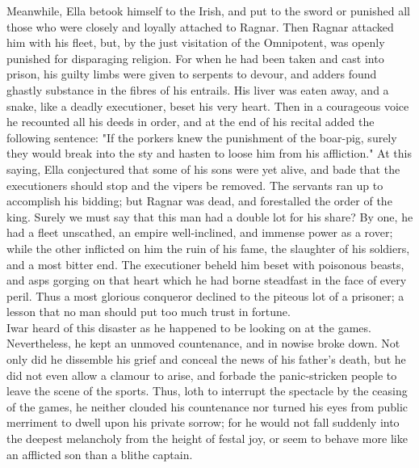 \documentclass[10pt,a4paper]{report}
\begin{document}
Meanwhile, Ella betook himself to the Irish, and put to the sword or punished all those who were closely and loyally attached to Ragnar. Then Ragnar attacked him with his fleet, but, by the just visitation of the Omnipotent, was openly punished for disparaging religion. For when he had been taken and cast into prison, his guilty limbs were given to serpents to devour, and adders found ghastly substance in the fibres of his entrails. His liver was eaten away, and a snake, like a deadly executioner, beset his very heart. Then in a courageous voice he recounted all his deeds in order, and at the end of his recital added the following sentence: "If the porkers knew the punishment of the boar-pig, surely they would break into the sty and hasten to loose him from his affliction." At this saying, Ella conjectured that some of his sons were yet alive, and bade that the executioners should stop and the vipers be removed. The servants ran up to accomplish his bidding; but Ragnar was dead, and forestalled the order of the king. Surely we must say that this man had a double lot for his share? By one, he had a fleet unscathed, an empire well-inclined, and immense power as a rover; while the other inflicted on him the ruin of his fame, the slaughter of his soldiers, and a most bitter end. The executioner beheld him beset with poisonous beasts, and asps gorging on that heart which he had borne steadfast in the face of every peril. Thus a most glorious conqueror declined to the piteous lot of a prisoner; a lesson that no man should put too much trust in fortune.\\

Iwar heard of this disaster as he happened to be looking on at the games. Nevertheless, he kept an unmoved countenance, and in nowise broke down. Not only did he dissemble his grief and conceal the news of his father's death, but he did not even allow a clamour to arise, and forbade the panic-stricken people to leave the scene of the sports. Thus, loth to interrupt the spectacle by the ceasing of the games, he neither clouded his countenance nor turned his eyes from public merriment to dwell upon his private sorrow; for he would not fall suddenly into the deepest melancholy from the height of festal joy, or seem to behave more like an afflicted son than a blithe captain.\\
\end{document}
